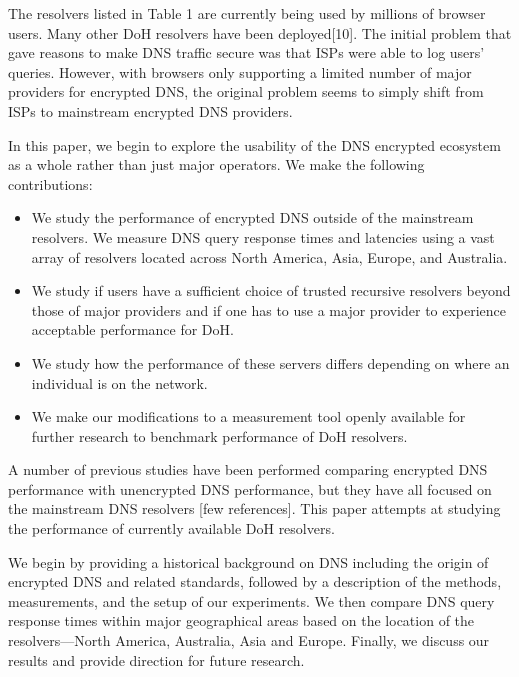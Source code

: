 The resolvers listed in Table 1 are currently being used by millions of browser users.
Many other DoH resolvers have been deployed[10].
The initial problem that gave reasons to make DNS traffic secure was that ISPs were able to log users' queries.
However, with browsers only supporting a limited number of major providers for encrypted DNS, the original problem seems to simply shift from ISPs to mainstream encrypted DNS providers.

In this paper, we begin to explore the usability of the DNS encrypted ecosystem as a whole rather than just major operators. We make the following contributions:
\begin{itemize}
\setlength\itemsep{0em}
\item We study the performance of encrypted DNS outside of the mainstream resolvers. We measure DNS query response times and latencies using a vast array of resolvers located across North America, Asia, Europe, and Australia. 
\item We study if users have a sufficient choice of trusted recursive resolvers beyond those of major providers and if one has to use a major provider to experience acceptable performance for DoH. 
\item We study how the performance of these servers differs depending on where an individual is on the network.
\item We make our modifications to a measurement tool openly available for further research to benchmark performance of DoH resolvers.
\end{itemize}

A number of previous studies have been performed comparing encrypted DNS performance with unencrypted DNS performance, but they have all focused on the mainstream DNS resolvers [few references].
This paper attempts at studying the performance of currently available DoH resolvers.

We begin by providing a historical background on DNS including the origin of encrypted DNS and related standards, followed by a description of the methods, measurements, and the setup of our experiments.
We then compare DNS query response times within major geographical areas based on the location of the resolvers—North America, Australia, Asia and Europe.
Finally, we discuss our results and provide direction for future research.